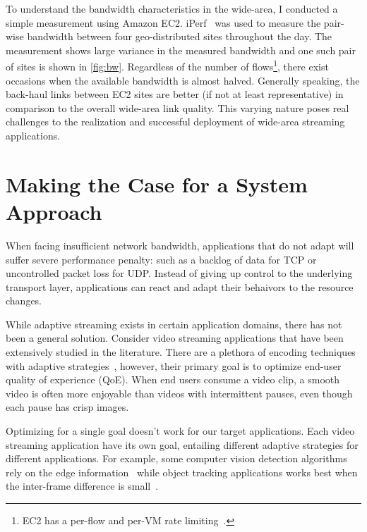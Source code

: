 To understand the bandwidth characteristics in the wide-area, I conducted a
simple measurement using Amazon EC2. iPerf~\cite{iperf} was used to measure the
pair-wise bandwidth between four geo-distributed sites throughout the day. The
measurement shows large variance in the measured bandwidth and one such pair of
sites is shown in \autoref{fig:bw}. Regardless of the number of
flows\footnote{EC2 has a per-flow and per-VM rate
  limiting~\cite{zhang2016guaranteeing}.}, there exist occasions when the
available bandwidth is almost halved. Generally speaking, the back-haul links
between EC2 sites are better (if not at least representative) in comparison to
the overall wide-area link quality. This varying nature poses real challenges to
the realization and successful deployment of wide-area streaming applications.

\section{Making the Case for a System Approach}
\label{sec:bat}

When facing insufficient network bandwidth, applications that do not adapt will
suffer severe performance penalty: such as a backlog of data for TCP or
uncontrolled packet loss for UDP. Instead of giving up control to the underlying
transport layer, applications can react and adapt their behaivors to the
resource changes.

While adaptive streaming exists in certain application domains, there has not
been a general solution. Consider video streaming applications that have been
extensively studied in the literature. There are a plethora of encoding
techniques~\cite{richardson2011h, grange2016vp9} with adaptive
strategies~\cite{yin2015control, michalos2012dynamic, pantos2016http}, however,
their primary goal is to optimize end-user quality of experience (QoE).  When
end users consume a video clip, a smooth video is often more enjoyable than
videos with intermittent pauses, even though each pause has crisp images.

Optimizing for a single goal doesn't work for our target applications. Each
video streaming application have its own goal, entailing different adaptive
strategies for different applications. For example, some computer vision
detection algorithms rely on the edge information~\cite{canny1986computational,
  lowe2004distinctive, viola2001rapid} while object tracking applications works
best when the inter-frame difference is small~\cite{allen2004object}.

